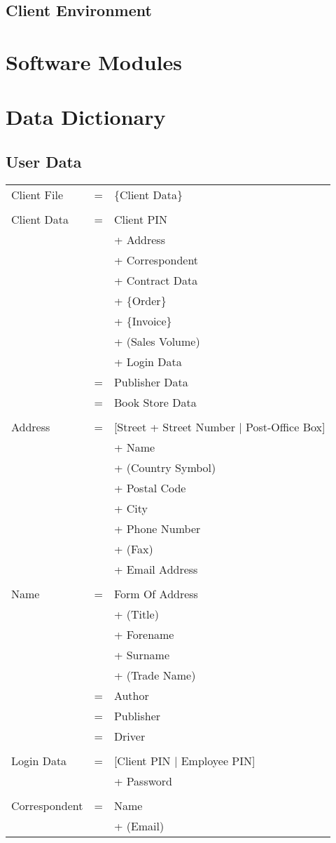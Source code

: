 \documentclass[11pt,a4paper,oneside,svgnames]{report}
\begin{document}
\section{Client Environment}
\chapter{Software Modules}
\chapter{Data Dictionary}

\section{User Data}

\begin{longtable}{p{3.5cm}p{0.5cm}p{8.5cm}}
Client File & = & \{Client Data\} \\
\\
Client Data & = & Client PIN\\
&  & + Address\\
&  & + Correspondent\\
&  & + Contract Data\\
&  & + \{Order\}\\
&  & + \{Invoice\}\\
&  & + (Sales Volume)\\
&  & + Login Data \\
& = & Publisher Data\\
& = & Book Store Data\\
\\
Address & = & [Street + Street Number $|$ Post-Office Box]\\
&  & + Name\\
&  & +  (Country Symbol)\\
&  & +  Postal Code\\
&  & + City\\
&  & + Phone Number\\
&  & + (Fax)\\
&  & + Email Address\\
\\
Name & = & Form Of Address\\
&  & + (Title)\\
&  & + Forename\\
&  & + Surname\\
&  & + (Trade Name)\\
& = & Author\\
& = & Publisher\\
& = & Driver\\
\\
Login Data & = & [Client PIN $|$ Employee PIN]\\
&  & + Password \\
\\
Correspondent & = & Name\\
&  & + (Email)\\
\end{longtable}
\end{document}
